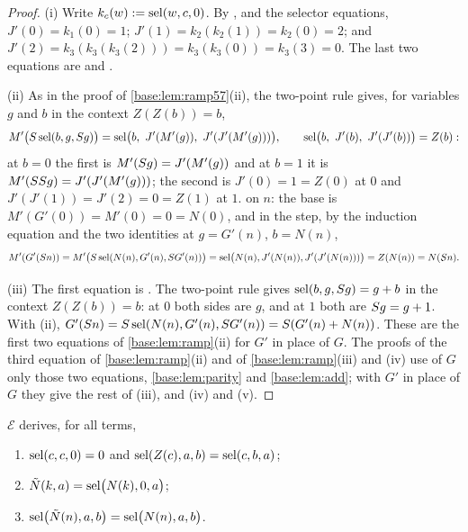 \begin{proof}
(i) Write $k_c(w)\mathrel{:=}\operatorname{sel}(w,c,0)$.  By ,  and the
selector equations, $J'(0)=k_1(0)=1$;
$J'(1)=k_2(k_2(1))=k_2(0)=2$; and
$J'(2)=k_3(k_3(k_3(2)))=k_3(k_3(0))=k_3(3)=0$.  The last two equations are
 and .

(ii) As in the proof of \cref{base:lem:ramp57}(ii), the two-point rule gives,
for variables $g$ and $b$ in the context $Z(Z(b))=b$,
\[
 M'\bigl(S\operatorname{sel}(b,g,S g)\bigr)=\operatorname{sel}\bigl(b,\ J'(M'(g)),\ J'(J'(M'(g)))\bigr),
 \qquad
 \operatorname{sel}\bigl(b,\ J'(b),\ J'(J'(b))\bigr)=Z(b):
\]
at $b=0$ the first is $M'(S g)=J'(M'(g))$ and at $b=1$ it is
$M'(SS g)=J'(J'(M'(g)))$; the second is $J'(0)=1=Z(0)$ at $0$ and
$J'(J'(1))=J'(2)=0=Z(1)$ at $1$.   on $n$: the base is
$M'(G'(0))=M'(0)=0=N(0)$, and in the step, by the induction equation and
the two identities at $g=G'(n)$, $b=N(n)$,
\[
 M'(G'(S n))=M'\bigl(S\operatorname{sel}(N(n),G'(n),S G'(n))\bigr)
 =\operatorname{sel}\bigl(N(n),J'(N(n)),J'(J'(N(n)))\bigr)=Z(N(n))=N(S n).
\]

(iii) The first equation is .  The two-point rule gives
$\operatorname{sel}(b,g,S g)=g+b$ in the context $Z(Z(b))=b$: at $0$ both sides are
$g$, and at $1$ both are $S g=g+1$.  With (ii), $G'(S n)=S\operatorname{sel}(N(n),G'(n),S G'(n))=S(G'(n)+N(n))$.
These are the first two equations of \cref{base:lem:ramp}(ii) for $G'$ in
place of $G$.  The proofs of the third equation of \cref{base:lem:ramp}(ii)
and of \cref{base:lem:ramp}(iii) and (iv) use of $G$ only those two
equations, \cref{base:lem:parity} and \cref{base:lem:add}; with $G'$ in place
of $G$ they give the rest of (iii), and (iv) and (v).
\end{proof}

\begin{lemma}
\label{base:lem:wparity}
$\mathcal E$ derives, for all terms,
\begin{enumerate}[label=\textup{(\roman*)}]
\item $\operatorname{sel}(c,c,0)=0$ and $\operatorname{sel}(Z(c),a,b)=\operatorname{sel}(c,b,a)$;
\item $\tilde N(k,a)=\operatorname{sel}\bigl(N(k),0,a\bigr)$;
\item $\operatorname{sel}\bigl(\tilde N(n),a,b\bigr)=\operatorname{sel}\bigl(N(n),a,b\bigr)$.
\end{enumerate}
\end{lemma}

